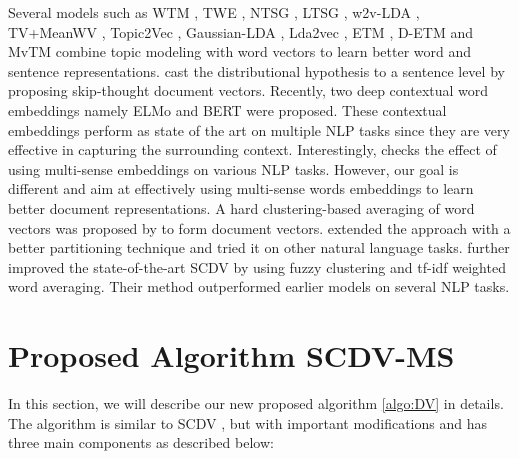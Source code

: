 \documentclass{ecai}
\newcommand{\method}{SCDV-MS}
\begin{document}
Several models such as WTM \cite{wtm}, TWE  \cite{liu2015learning}, NTSG \cite{liu2015learning}, LTSG \cite{ltsg},  w2v-LDA \cite{wtvlda}, TV+MeanWV \cite{tvMeanWV}, Topic2Vec \cite{topic2vec}, Gaussian-LDA \cite{gaussianlda}, Lda2vec \cite{lda2vec}, ETM \cite{dieng2019topic}, D-ETM \cite{dieng2019dynamic} and MvTM \cite{mvtm} combine topic modeling \cite{Blei:2003} with word vectors to learn better word and sentence representations. \cite{kiros2015} cast the distributional hypothesis to a sentence level by proposing skip-thought document vectors.  Recently, two deep contextual word embeddings namely ELMo \cite{Peters:2018} and BERT \cite{devlin2018bert} were proposed. These contextual embeddings perform as state of the art on multiple NLP tasks since they are very effective in capturing the surrounding context. Interestingly, \cite{li2015multi} checks the effect of using multi-sense embeddings on various NLP tasks. However, our goal is different and aim at effectively using multi-sense words embeddings to learn better document representations. A hard clustering-based averaging of word vectors was proposed by \cite{vivek,hadi2019vector} to form document vectors. \cite{gupta2019unsupervised} extended the approach with a better partitioning technique and tried it on other natural language tasks. \cite{mekala2017scdv} further improved the state-of-the-art SCDV by using fuzzy clustering and tf-idf weighted word averaging. Their method outperformed earlier models on several NLP tasks.

\section{Proposed Algorithm \method{}}
\label{sec:proposeAlgo}

In this section, we will describe our new proposed algorithm \ref{algo:DV} in details. The algorithm is similar to SCDV \cite{mekala2017scdv}, but with important modifications and has three main components as described below:
\end{document}
